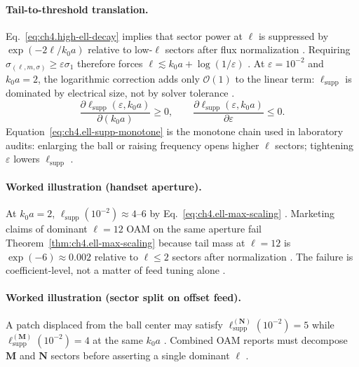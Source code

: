 \paragraph{Tail-to-threshold translation.}
Eq.~\eqref{eq:ch4.high-ell-decay} implies that sector power at \(\ell\) is suppressed by \(\exp(-2\ell/k_{0}a)\) relative to low-\(\ell\)
sectors after flux normalization \cite{hansen1988,jackson1999}. Requiring \(\sigma_{(\ell,m,\sigma)}\ge\varepsilon\sigma_{1}\) therefore
forces \(\ell\lesssim k_{0}a+\log(1/\varepsilon)\) \cite{stratton1941}. At \(\varepsilon=10^{-2}\) and \(k_{0}a=2\), the logarithmic
correction adds only \(\mathcal{O}(1)\) to the linear term: \(\ell_{\mathrm{supp}}\) is dominated by electrical size, not by solver tolerance
\cite{harrington2001,devaney2004}.
\begin{equation}
\label{eq:ch4.ell-supp-monotone}
\frac{\partial\ell_{\mathrm{supp}}(\varepsilon,k_{0}a)}{\partial(k_{0}a)}\ge0,\qquad
\frac{\partial\ell_{\mathrm{supp}}(\varepsilon,k_{0}a)}{\partial\varepsilon}\le0.
\end{equation}
Equation~\eqref{eq:ch4.ell-supp-monotone} is the monotone chain used in laboratory audits: enlarging the ball or raising frequency opens
higher \(\ell\) sectors; tightening \(\varepsilon\) lowers \(\ell_{\mathrm{supp}}\) \cite{hansen1988,jackson1999}.

\paragraph{Worked illustration (handset aperture).}
At \(k_{0}a=2\), \(\ell_{\mathrm{supp}}(10^{-2})\approx4\)--\(6\) by Eq.~\eqref{eq:ch4.ell-max-scaling} \cite{hansen1988,jackson1999,harrington2001}.
Marketing claims of dominant \(\ell=12\) OAM on the same aperture fail Theorem~\ref{thm:ch4.ell-max-scaling} because tail mass at
\(\ell=12\) is \(\exp(-6)\approx0.002\) relative to \(\ell\le2\) sectors after normalization \cite{devaney2004}. The failure is
coefficient-level, not a matter of feed tuning alone \cite{stratton1941}.

\paragraph{Worked illustration (sector split on offset feed).}
A patch displaced from the ball center may satisfy \(\ell_{\mathrm{supp}}^{(\mathbf{N})}(10^{-2})=5\) while
\(\ell_{\mathrm{supp}}^{(\mathbf{M})}(10^{-2})=4\) at the same \(k_{0}a\) \cite{harrington2001,jackson1999,hansen1988}. Combined OAM
reports must decompose \(\mathbf{M}\) and \(\mathbf{N}\) sectors before asserting a single dominant \(\ell\) \cite{stratton1941,devaney2004}.

